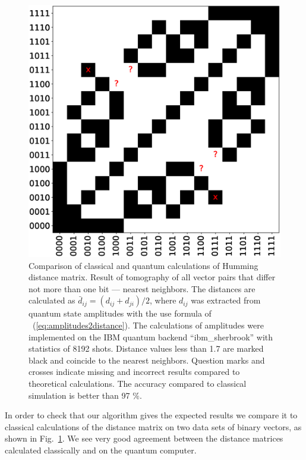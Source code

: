 \documentclass[pra,showkeys,twocolumn,showpacs,aps,10pt]{revtex4-2}
\begin{document}
\begin{figure}[t]
  \includegraphics[width=\columnwidth]{distance_matrix.eps}
  \caption{%
    Comparison of classical and quantum calculations of Humming distance matrix. Result of tomography of all vector pairs that differ not more than one bit --- nearest neighbors.  The distances are calculated as $\bar d_{ij} = (d_{ij} + d_{ji}) / 2$,
    where $d_{ij}$ was extracted from quantum state amplitudes with the use formula of ~(\ref{eq:amplitudes2distance}).
    The calculations of amplitudes were implemented on the IBM quantum backend ``ibm\_sherbrook'' with statistics of 8192 shots. Distance values less than 1.7 are marked black and coincide to the nearest neighbors.
    Question marks and crosses indicate missing and incorrect results compared to theoretical calculations.
    The accuracy compared to classical simulation is better than 97 $\%$.
  }
  \label{fig:distance_matrix}
\end{figure}



In order to check that our algorithm gives the expected results we compare it to classical calculations of the distance matrix on two data sets of binary vectors, as shown in Fig.~\ref{fig:distance_matrix}.
We see very good agreement between the distance matrices calculated classically and on the quantum computer.
\end{document}
